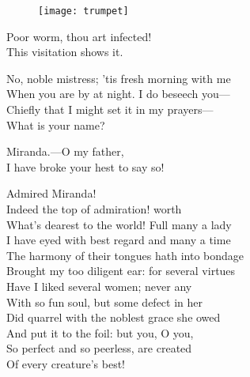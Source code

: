 \begin{a4}
	\begin{figure}[tb]
		\centering
		\texttt{[image: trumpet]}
	\end{figure}
\end{a4}

\begin{verse_speech}[Prospero] 
Poor worm, thou art infected!\\
This visitation shows it.
\end{verse_speech}


\begin{verse_speech}[Ferdinand] 
No, noble mistress; 'tis fresh morning with me\\
When you are by at night. I do beseech you—\\
Chiefly that I might set it in my prayers—\\
What is your name?
\end{verse_speech}

\begin{verse_speech}[Miranda] 
Miranda.—O my father,\\
I have broke your hest to say so!
\end{verse_speech}

\begin{verse_speech}[Ferdinand] 
Admired Miranda!\\
Indeed the top of admiration! worth\\
What's dearest to the world! Full many a lady\\
I have eyed with best regard and many a time\\
The harmony of their tongues hath into bondage\\
Brought my too diligent ear: for several virtues\\
Have I liked several women; never any\\
With so fun soul, but some defect in her\\
Did quarrel with the noblest grace she owed\\
And put it to the foil: but you, O you,\\
So perfect and so peerless, are created\\
Of every creature's best!
\end{verse_speech}

